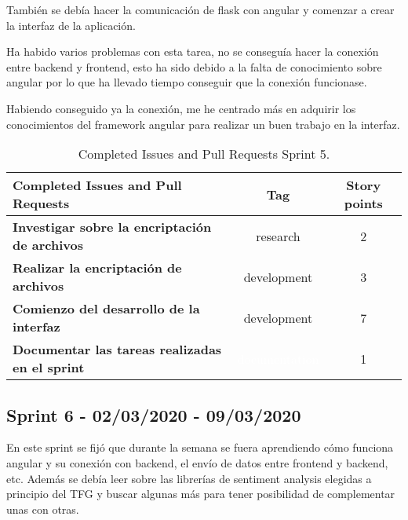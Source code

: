 También se debía hacer la comunicación de flask con angular y comenzar a crear la interfaz de la aplicación.

Ha habido varios problemas con esta tarea, no se conseguía hacer la conexión entre backend y frontend, esto ha sido debido a la falta de conocimiento sobre angular por lo que ha llevado tiempo conseguir que la conexión funcionase.

Habiendo conseguido ya la conexión, me he centrado más en adquirir los conocimientos del framework angular para realizar un buen trabajo en la interfaz.


\begin{table}[ht!]
    \centering
    \resizebox{15cm}{!} {
    \begin{tabular}{|l|c|c|}
    \hline
    \rowcolor[rgb]{0.81,0.81,0.77}
    \textbf{Completed Issues and Pull Requests}     &\textbf{Tag}     & \textbf{Story points} \\ \hline
    \textbf{Investigar sobre la encriptación de archivos}         &\cellcolor[rgb]{0.6,1.0,0.6}research      &2 \\ \hline 
    \textbf{Realizar la encriptación de archivos}         &\cellcolor[rgb]{0.69,0.93,0.93}development      &3 \\ \hline
    \textbf{Comienzo del desarrollo de la interfaz}         &\cellcolor[rgb]{0.69,0.93,0.93}development      &7 \\ \hline 
    \textbf{Documentar las tareas realizadas en el sprint}         &\cellcolor[rgb]{0.0,0.33,0.71}\textcolor{white}{documentation}     &1 \\ \hline 
    \end{tabular}}
    \caption{Completed Issues and Pull Requests Sprint 5.}
    \label{tab:my_label}
\end{table}


\subsection{Sprint 6 - 02/03/2020 - 09/03/2020}
En este sprint se fijó que durante la semana se fuera aprendiendo cómo funciona angular y su conexión con backend, el envío de datos entre frontend y backend, etc. Además se debía leer sobre las librerías de sentiment analysis elegidas a principio del TFG y buscar algunas más para tener posibilidad de complementar unas con otras.


